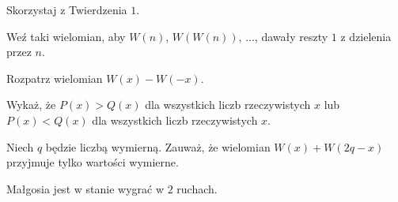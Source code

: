 
\begin{hints_list}
	\item Skorzystaj z Twierdzenia $1$.
	\item Weź taki wielomian, aby $W(n)$, $W(W(n))$, ..., dawały reszty $1$ z dzielenia przez $n$.
	\item Rozpatrz wielomian $W(x) - W(-x)$.
	\item Wykaż, że $P(x) > Q(x)$ dla wszystkich liczb rzeczywistych $x$ lub $P(x) < Q(x)$ dla wszystkich liczb rzeczywistych $x$.
	\item Niech $q$ będzie liczbą wymierną. Zauważ, że wielomian $W(x) + W(2q - x)$ przyjmuje tylko wartości wymierne.
	\item Małgosia jest w stanie wygrać w $2$ ruchach.
\end{hints_list}